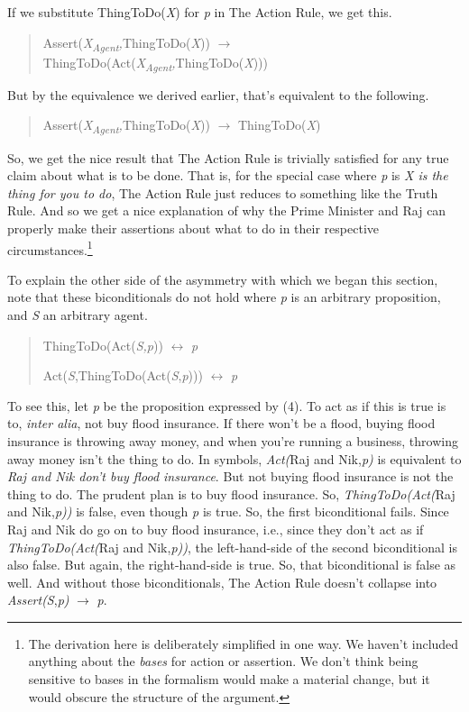 \noindent If we substitute ThingToDo(\textit{X}) for \textit{p} in The Action Rule, we get this.

\begin{quote}
Assert(\textit{X}\textit{\textsubscript{Agent}}\textit{,}ThingToDo(\textit{X})) ${\rightarrow}$ ThingToDo(Act(\textit{X}\textit{\textsubscript{Agent}}\textit{,}ThingToDo(\textit{X})))
\end{quote}

\noindent But by the equivalence we derived earlier, that's equivalent to the following.

\begin{quote}
Assert(\textit{X}\textit{\textsubscript{Agent}}\textit{,}ThingToDo(\textit{X})) ${\rightarrow}$ ThingToDo(\textit{X})
\end{quote}

\noindent So, we get the nice result that The Action Rule is trivially satisfied for any true claim about what is to be done. That is, for the special case where \textit{p }is \textit{X is the thing for you to do}, The Action Rule just reduces to something like the Truth Rule. And so we get a nice explanation of why the Prime Minister and Raj can properly make their assertions about what to do in their respective circumstances.\footnote{The derivation here is deliberately simplified in one way. We haven't included anything about the \textit{bases} for action or assertion. We don't think being sensitive to bases in the formalism would make a material change, but it would obscure the structure of the argument.} 

To explain the other side of the asymmetry with which we began this section, note that these biconditionals do not hold where \textit{p} is an arbitrary proposition, and \textit{S} an arbitrary agent.

\begin{quote}
ThingToDo(Act(\textit{S,p})) ${\leftrightarrow}$ \textit{p}

Act(\textit{S},ThingToDo(Act(\textit{S},\textit{p}))) ${\leftrightarrow}$ \textit{p}
\end{quote}

\noindent To see this, let \textit{p} be the proposition expressed by (4). To act as if this is true is to, \textit{inter alia}, not buy flood insurance. If there won't be a flood, buying flood insurance is throwing away money, and when you're running a business, throwing away money isn't the thing to do. In symbols, \textit{Act(}Raj and Nik,\textit{p)} is equivalent to \textit{Raj and Nik don't buy flood insurance}. But not buying flood insurance is not the thing to do. The prudent plan is to buy flood insurance. So, \textit{ThingToDo(Act(}Raj and Nik,\textit{p))} is false, even though \textit{p} is true. So, the first biconditional fails. Since Raj and Nik do go on to buy flood insurance, i.e., since they don't act as if \textit{ThingToDo(Act(}Raj and Nik,\textit{p))}, the left-hand-side of the second biconditional is also false. But again, the right-hand-side is true. So, that biconditional is false as well. And without those biconditionals, The Action Rule doesn't collapse into \textit{Assert(S},\textit{p) }\textit{${\rightarrow}$}\textit{ p}.

